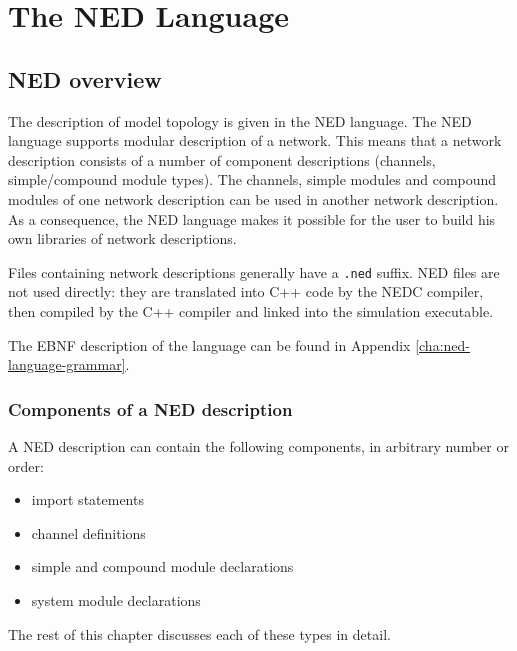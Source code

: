 \chapter{The NED Language}
\label{cha:the-ned-language}


\section{NED overview}

The description of model topology is given in the NED
language. The NED language supports modular
description of a network. This means that a network
description consists of a number of
component descriptions (channels,
simple/compound module
types). The channels, simple modules and compound
modules of one network description can be used in another network
description. As a consequence, the NED language makes it possible for
the user to build his own libraries of network descriptions.


Files containing network descriptions generally have a \texttt{.ned}
suffix.  NED files are not used directly: they are
translated into C++ code by the NEDC compiler, then compiled by the
C++ compiler and linked into the simulation executable.


The EBNF description of the language can be found in Appendix
\ref{cha:ned-language-grammar}.





\subsection{Components of a NED description}

A NED description can contain the following components, in arbitrary
number or order:
\begin{itemize}
  \item{import statements}
  \item{channel definitions}
  \item{simple and compound module declarations}
  \item{system module declarations}
\end{itemize}

The rest of this chapter discusses each of these types in detail.





